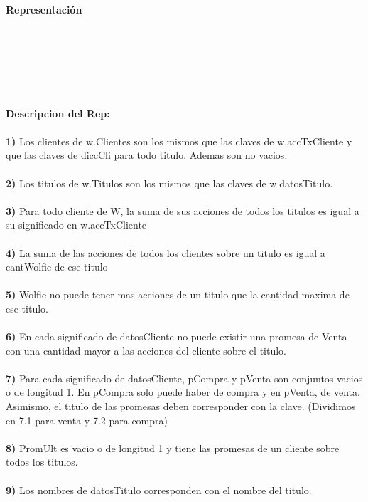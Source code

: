\documentclass[10pt, a4paper]{article}
\newenvironment{Representacion}{%
  \vspace*{2ex}%
  \noindent\textbf{\Large Representaci\'{o}n}%
  \vspace*{2ex}%
}{}
\begin{document}
\begin{Representacion}
  \begin{Tupla}[datosCliente]
      \\
      \\
    \end{Tupla}
\\ \\ \\
\textbf{Descripcion del Rep:}
\\ \\
\textbf{1)} Los clientes de w.Clientes son los mismos que las claves de w.accTxCliente y que las claves de diccCli para todo titulo. Ademas son no vacios.
\\ \\
\textbf{2)} Los titulos de w.Titulos son los mismos que las claves de w.datosTitulo.
\\ \\
\textbf{3)} Para todo cliente de W, la suma de sus acciones de todos los titulos es igual a su significado en
w.accTxCliente
\\ \\
\textbf{4)} La suma de las acciones de todos los clientes sobre un titulo es igual a cantWolfie de ese titulo 
\\ \\
\textbf{5)} Wolfie no puede tener mas acciones de un titulo que la cantidad maxima de ese titulo.
\\ \\
\textbf{6)} En cada significado de datosCliente no puede existir una promesa de Venta con una cantidad mayor a las acciones del cliente sobre el titulo.
\\ \\
\textbf{7)} Para cada significado de datosCliente, pCompra y pVenta son conjuntos vacios o de longitud 1. En pCompra solo puede haber de compra y en pVenta, de venta. Asimismo, el titulo de las promesas deben corresponder con la clave. (Dividimos en 7.1 para venta y 7.2 para compra)
\\ \\
\textbf{8)} PromUlt es vacio o de longitud 1 y tiene las promesas de un cliente sobre todos los titulos.
\\ \\
\textbf{9)} Los nombres de datosTitulo corresponden con el nombre del titulo.
\\ \\ \\	
\end{Representacion}
\end{document}
